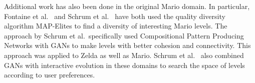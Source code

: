 


Additional work has also been done in the original Mario domain.
In particular, Fontaine et al.~\cite{fontaine2020illuminating} and Schrum et al.~\cite{schrum:gecco2020cppn2gan} have both used the quality diversity algorithm MAP-Elites \cite{mouret:arxiv15} to find a diversity of interesting Mario levels. The approach by Schrum et al.\ specifically used Compositional Pattern Producing Networks \cite{stanley:gpem2007} with GANs to make levels with better cohesion and connectivity. This approach was applied to Zelda as well as Mario. Schrum et al.~\cite{schrum2020interactive} also combined GANs with interactive evolution in these domains to search the space of levels according to user preferences.



